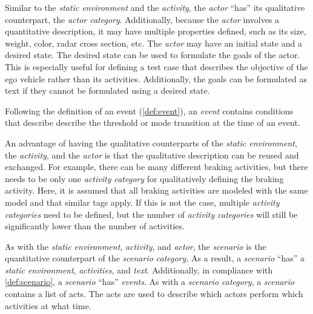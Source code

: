 \cbstart
Similar to the \textit{static environment} and the \textit{activity}, the \textit{actor} ``has'' its qualitative counterpart, the \textit{actor category}. Additionally, because the \textit{actor} involves a quantitative description, it may have multiple properties defined, such as its size, weight, color, radar cross section, etc. The \textit{actor} may have an initial state and a desired state. The desired state can be used to formulate the goals of the actor. This is especially useful for defining a test case that describes the objective of the ego vehicle rather than its activities. Additionally, the goals can be formulated as text if they cannot be formulated using a desired state.
\cbend

\cbstartd
Following the definition of an event (\cref{def:event}), an \textit{event} contains conditions that describe describe the threshold or mode transition at the time of an event.
\cbend

An advantage of having the qualitative counterparts of the \textit{static environment}, the \textit{activity}, and the \textit{actor} is that the qualitative description can be reused and exchanged. For example, there can be many different braking activities, but there needs to be only one \textit{activity category} for qualitatively defining the braking activity. Here, it is assumed that all braking activities are modeled with the same model and that similar tags apply. If this is not the case, multiple \textit{activity categories} need to be defined, but the number of \textit{activity categories} will still be significantly lower than the number of activities.

As with the \textit{static environment}, \textit{activity}, and \textit{actor}, the \textit{scenario} is the quantitative counterpart of the \textit{scenario category}. As a result, a \textit{scenario} ``has'' a \textit{static environment}, \textit{activities}, and \textit{text}. Additionally, in compliance with \cref{def:scenario}, a \textit{scenario} ``has'' \textit{events}. As with a \textit{scenario category}, a \textit{scenario} contains a list of acts.
The acts are used to describe which actors perform which activities at what time.\cbend
